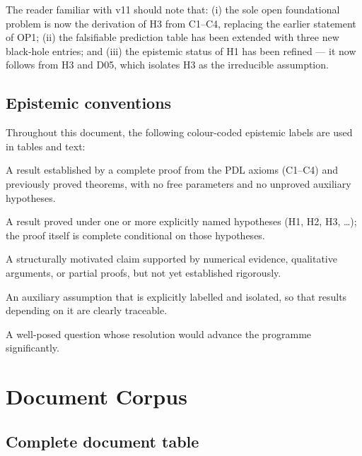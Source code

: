 \documentclass[11pt,a4paper]{article}
\theoremstyle{plain}
\theoremstyle{definition}
\theoremstyle{remark}
\begin{document}
The reader familiar with v11 should note that: (i) the sole open foundational problem is now the derivation of H3 from C1--C4, replacing the earlier statement of OP1; (ii) the falsifiable prediction table has been extended with three new black-hole entries; and (iii) the epistemic status of H1 has been refined — it now follows from H3 and D05, which isolates H3 as the irreducible assumption.

\subsection{Epistemic conventions}
\label{subsec:conventions}

Throughout this document, the following colour-coded epistemic labels are used in tables and text:
\begin{description}[leftmargin=2.5cm,style=nextline]
\item[\textcolor{proofblue}{Theorem}] A result established by a complete proof from the PDL axioms (C1--C4) and previously proved theorems, with no free parameters and no unproved auxiliary hypotheses.
\item[\textcolor{proofblue}{Theorem (H)}] A result proved under one or more explicitly named hypotheses (H1, H2, H3, \ldots); the proof itself is complete conditional on those hypotheses.
\item[\textcolor{conjecturegreen}{Conjecture}] A structurally motivated claim supported by numerical evidence, qualitative arguments, or partial proofs, but not yet established rigorously.
\item[\textcolor{hypothesisorange}{Named Hypothesis}] An auxiliary assumption that is explicitly labelled and isolated, so that results depending on it are clearly traceable.
\item[\textcolor{openproblemred}{Open Problem}] A well-posed question whose resolution would advance the programme significantly.
\end{description}

\section{Document Corpus}
\label{sec:corpus}

\subsection{Complete document table}
\label{subsec:doc_table}
\end{document}
